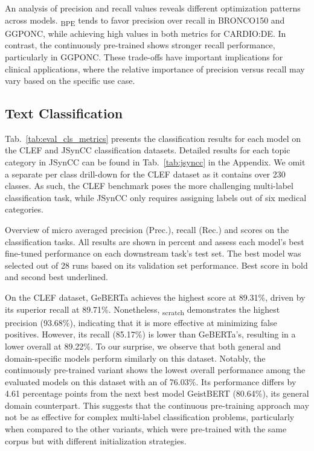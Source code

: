 An analysis of precision and recall values reveals different optimization
patterns across models. \ChristBERT\textsubscript{BPE} tends to favor precision
over recall in BRONCO150 and GGPONC, while achieving high values in both metrics
for CARDIO:DE. In contrast, the continuously pre-trained \ChristBERT{} shows
stronger recall performance, particularly in GGPONC. These trade-offs have
important implications for clinical applications, where the relative importance
of precision versus recall may vary based on the specific use case.
\subsection{Text Classification}

Tab.~\ref{tab:eval_cls_metrics} presents the classification results for each
model on the CLEF and JSynCC classification datasets. Detailed results for each
topic category in JSynCC can be found in Tab.~\ref{tab:jsyncc} in the Appendix.
We omit a separate per class drill-down for the CLEF dataset as it contains over
230 classes. As such, the CLEF benchmark poses the more challenging multi-label
classification task, while JSynCC only requires assigning labels out of six
medical categories.

\begin{table}[htbp]
    \centering
     
    \caption[Overview of micro averaged precision, recall and \ff{} scores
    achieved on the classification tasks]{Overview of micro averaged precision
    (Prec.), recall (Rec.) and \ff{} scores on the classification tasks. All
    results are shown in percent and assess each model's best fine-tuned
    performance on each downstream task's test set. The best model was selected
    out of 28 runs based on its validation set performance. Best score in bold
    and second best underlined.}
    \label{tab:eval_cls_metrics}
\end{table}

On the CLEF dataset, GeBERTa achieves the highest \ff{} score at 89.31\%, driven
by its superior recall at 89.71\%. Nonetheless,
\ChristBERT\textsubscript{scratch} demonstrates the highest precision (93.68\%),
indicating that it is more effective at minimizing false positives. However, its
recall (85.17\%) is lower than GeBERTa's, resulting in a lower overall \ff{} at
89.22\%. To our surprise, we observe that both general and domain-specific
models perform similarly on this dataset. Notably, the continuously pre-trained
\ChristBERT{} variant shows the lowest overall performance among the evaluated
models on this dataset with an \ff{} of 76.03\%. Its performance differs by 4.61
percentage points from the next best model GeistBERT (80.64\%), its general
domain counterpart. This suggests that the continuous pre-training approach may
not be as effective for complex multi-label classification problems,
particularly when compared to the other \ChristBERT{} variants, which were
pre-trained with the same corpus but with different initialization strategies. 

